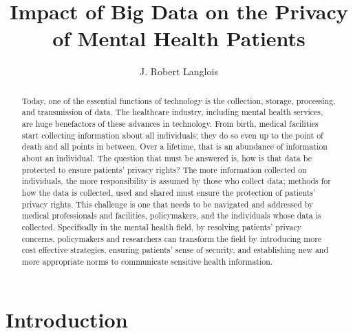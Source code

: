 \documentclass[sigconf]{acmart}
\begin{document}
\title{Impact of Big Data on the Privacy of  Mental Health Patients}


\author{J. Robert Langlois}

\begin{abstract}
Today, one of the essential functions of technology is the collection, storage, processing, and transmission of data. The healthcare industry, including mental health services, are huge benefactors of these advances in technology. From birth, medical facilities start collecting information about all individuals; they do so even up to the point of death and all points in between. Over a lifetime, that is an abundance of information about an individual. The question that must be answered is, how is that data be protected to ensure patients' privacy rights? The more information collected on individuals, the more responsibility is assumed by those who collect data; methods for how the data is collected, used and shared must ensure the protection of patients' privacy rights. This challenge is one that needs to be navigated and addressed by medical professionals and facilities, policymakers, and the individuals whose data is collected. Specifically in the mental health field, by resolving patients' privacy concerns, policymakers and researchers can transform the field by introducing more cost effective strategies, ensuring patients' sense of security, and establishing new and more appropriate norms to communicate sensitive health information.        
\end{abstract}


\maketitle

\section{Introduction}
\end{document}
